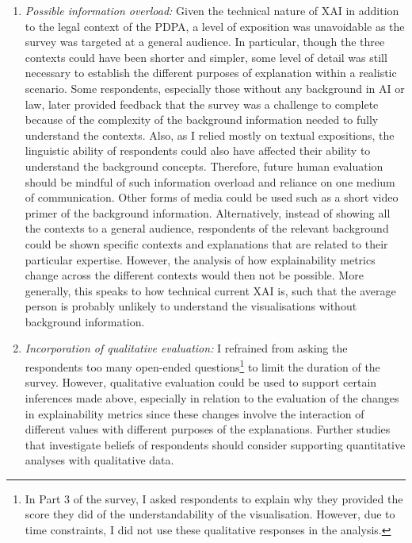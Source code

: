 \begin{enumerate}
    \item \textit{Possible information overload:} Given the technical nature of XAI in addition to the legal context of the PDPA, a level of exposition was unavoidable as the survey was targeted at a general audience. In particular, though the three contexts could have been shorter and simpler, some level of detail was still necessary to establish the different purposes of explanation within a realistic scenario. Some respondents, especially those without any background in AI or law, later provided feedback that the survey was a challenge to complete because of the complexity of the background information needed to fully understand the contexts. Also, as I relied mostly on textual expositions, the linguistic ability of respondents could also have affected their ability to understand the background concepts. Therefore, future human evaluation should be mindful of such information overload and reliance on one medium of communication. Other forms of media could be used such as a short video primer of the background information. Alternatively, instead of showing all the contexts to a general audience, respondents of the relevant background could be shown specific contexts and explanations that are related to their particular expertise. However, the analysis of how explainability metrics change across the different contexts would then not be possible. More generally, this speaks to how technical current XAI is, such that the average person is probably unlikely to understand the visualisations without background information.
    
    \item \textit{Incorporation of qualitative evaluation:} I refrained from asking the respondents too many open-ended questions\footnote{In Part 3 of the survey, I asked respondents to explain why they provided the score they did of the understandability of the visualisation. However, due to time constraints, I did not use these qualitative responses in the analysis.} to limit the duration of the survey. However, qualitative evaluation could be used to support certain inferences made above, especially in relation to the evaluation of the changes in explainability metrics since these changes involve the interaction of different values with different purposes of the explanations. Further studies that investigate beliefs of respondents should consider supporting quantitative analyses with qualitative data.


\end{enumerate}
